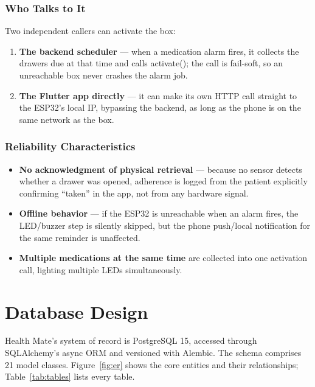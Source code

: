 \documentclass[12pt,a4paper]{report}
\begin{document}
\subsection{Who Talks to It}

Two independent callers can activate the box:

\begin{enumerate}[leftmargin=1.6em]
  \item \textbf{The backend scheduler} --- when a medication alarm fires, it
  collects the drawers due at that time and calls activate(); the call is
  fail-soft, so an unreachable box never crashes the alarm job.
  \item \textbf{The Flutter app directly} --- it can make its own HTTP call
  straight to the ESP32's local IP, bypassing the backend, as long as the phone
  is on the same network as the box.
\end{enumerate}

\subsection{Reliability Characteristics}

\begin{itemize}[leftmargin=1.4em]
  \item \textbf{No acknowledgment of physical retrieval} --- because no sensor
  detects whether a drawer was opened, adherence is logged from the patient
  explicitly confirming ``taken'' in the app, not from any hardware signal.
  \item \textbf{Offline behavior} --- if the ESP32 is unreachable when an alarm
  fires, the LED/buzzer step is silently skipped, but the phone push/local
  notification for the same reminder is unaffected.
  \item \textbf{Multiple medications at the same time} are collected into one
  activation call, lighting multiple LEDs simultaneously.
\end{itemize}


\chapter{Database Design}

Health Mate's system of record is PostgreSQL 15, accessed through SQLAlchemy's
async ORM and versioned with Alembic. The schema comprises 21 model classes.
Figure~\ref{fig:er} shows the core entities and their relationships;
Table~\ref{tab:tables} lists every table.
\end{document}
